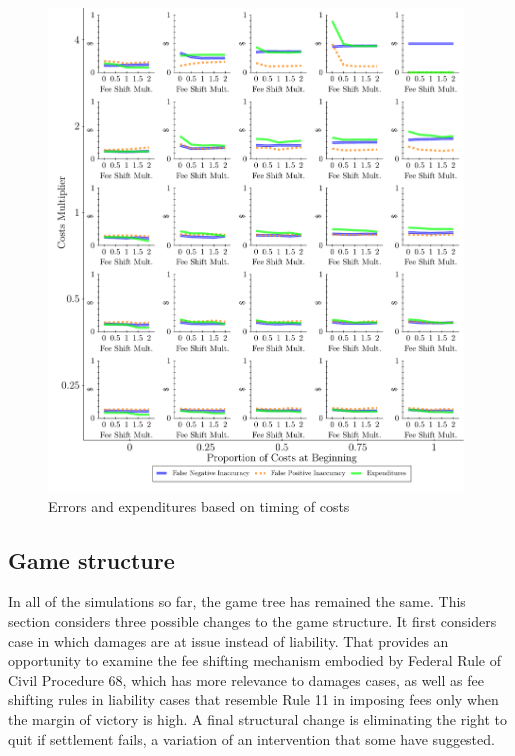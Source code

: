 \documentclass{article}
\begin{document}
\begin{figure}
\begin{minipage}{0.48\textwidth}
        \includegraphics[width=0.98\textwidth, scale=0.70, trim={0in 0in 0in 0in}, clip]{../Figures/Accuracy and Expenditures Varying Proportion of Costs at Beginning} %
        \caption{Errors and expenditures based on timing of costs}
		\label{fig:accexp_timing}
    \end{minipage}
\end{figure}

\subsection{Game structure}

In all of the simulations so far, the game tree has remained the same. This section considers three possible changes to the game structure. It first considers case in which damages are at issue instead of liability. That provides an opportunity to examine the fee shifting mechanism embodied by Federal Rule of Civil Procedure 68, which has more relevance to damages cases, as well as fee shifting rules in liability cases that resemble Rule 11 in imposing fees only when the margin of victory is high. A final structural change is eliminating the right to quit if settlement fails, a variation of an intervention that some have suggested.
\end{document}
